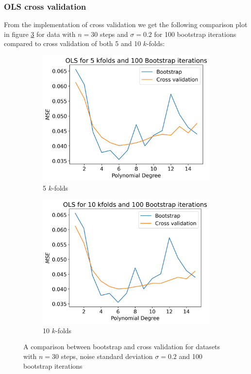 \documentclass[12pt]{article}
\begin{document}
\subsubsection{OLS cross validation}
From the implementation of cross validation we get the following comparison plot in figure \ref{fig:cv_comp} for data with $n=30$ steps and $\sigma=0.2$ for 100 bootstrap iterations compared to cross validation of both 5 and 10 $k$-folds:
\begin{figure}[H]
  \begin{subfigure}{.5\textwidth}
    \centering
    \includegraphics[width=\textwidth]{../figures/boot_cv_comp_OLS_100_5.png}
    \caption{5 $k$-folds}
    \label{fig:cv_b_comp_5}
  \end{subfigure}
  \begin{subfigure}{.5\textwidth}
    \centering
    \includegraphics[width=\textwidth]{../figures/boot_cv_comp_OLS_100_10.png}
    \caption{10 $k$-folds}
    \label{fig:cv_b_comp_10}
  \end{subfigure}
  \caption{A comparison between bootstrap and cross validation for datasets with $n=30$ steps, noise standard deviation $\sigma=0.2$ and 100 bootstrap iterations}
  \label{fig:cv_comp}
\end{figure}
\end{document}
